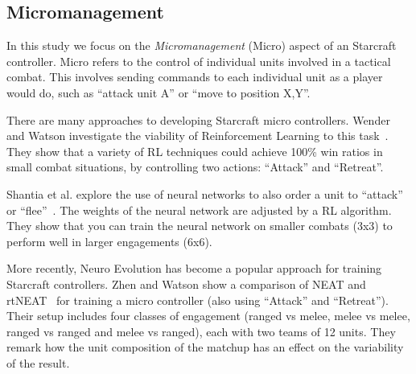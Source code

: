 
\subsection{Micromanagement}

In this study we focus on the \emph{Micromanagement} (Micro) aspect of
an Starcraft controller. Micro refers to the control of individual
units involved in a tactical combat. This involves sending commands to
each individual unit as a player would do, such as ``attack unit A'' or
``move to position X,Y''.


There are many approaches to developing Starcraft micro
controllers. Wender and Watson investigate the viability of
Reinforcement Learning to this task~\cite{Wender12ReinforcementMicroSC}. They show that a
variety of RL techniques could achieve 100\% win ratios in small
combat situations, by controlling two actions: ``Attack'' and
``Retreat''.

Shantia et al. explore the use of neural networks to also order a unit
to ``attack'' or ``flee''~\cite{Shantia11ConnectionistSC}. The weights of the neural
network are adjusted by a RL algorithm. They show that you can train
the neural network on smaller combats (3x3) to perform well in larger
engagements (6x6).

More recently, Neuro Evolution has become a popular approach for
training Starcraft controllers. Zhen and Watson show a comparison of
NEAT and rtNEAT~\cite{Zhen13NeuroEvoSC} for training a micro controller (also
using ``Attack'' and ``Retreat''). Their setup includes four classes
of engagement (ranged vs melee, melee vs melee, ranged vs ranged and
melee vs ranged), each with two teams of 12 units. They remark how the
unit composition of the matchup has an effect on the variability of
the result.


